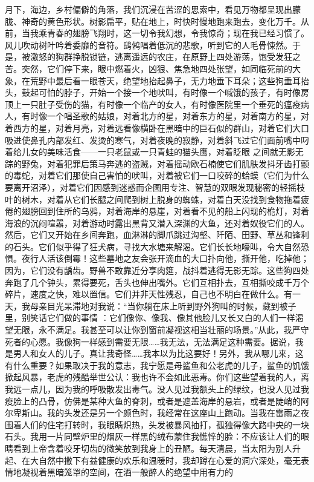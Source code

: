 \documentclass{article}
\begin{document}
月下，海边，乡村偏僻的角落，我们沉浸在苦涩的思索中，看见万物都呈现出朦胧、神奇的黄色形状。树影扁平，贴在地上，时快时慢地跑来跑去，变化万千。从前，当我乘青春的翅膀飞翔时，这一切令我幻想，令我惊奇；现在我已经习惯了。风儿吹动树叶吟着委靡的音符。鸱鸺唱着低沉的悲歌，听到它的人毛骨悚然。于是，被激怒的狗群挣脱锁链，逃离遥远的农庄，在原野上四处游荡，饱受发狂之苦。突然，它们停下来，眼中燃着火，凶狠、焦急地四处张望，如同临死前的大象，在荒野中最后看一眼苍天，绝望地抬起鼻子，无力地垂下耳朵；这些狗垂耳抬头，鼓起可怕的脖子，开始一个接一个地吠叫，有时像一个喊饿的孩子，有时像房顶上一只肚子受伤的猫，有时像一个临产的女人，有时像医院里一个垂死的瘟疫病人，有时像一个唱圣歌的姑娘，对着北方的星，对着东方的星，对着南方的星，对着西方的星，对着月亮，对着远看像横卧在黑暗中的巨石似的群山，对着它们大口吸进使鼻孔内部发红、发烫的寒气，对着夜晚的寂静，对着斜飞过它们面前嘴中叼着给儿女的美味活食——一只老鼠或一只青蛙的猫头鹰，对着眨眼
\newpage
之间就无影无踪的野兔，对着犯罪后策马奔逃的盗贼，对着摇动欧石楠使它们肌肤发抖牙齿打颤的毒蛇，对着它们那使自己害怕的吠叫，对着被它们一口咬碎的蛤蟆（它们为什么要离开沼泽），对着它们因感到迷惑而企图用专注、智慧的双眼发现秘密的轻摇枝叶的树木，对着从它们长腿之间爬到树上脱身的蜘蛛，对着白天没找到食物拖着疲倦的翅膀回到住所的乌鸦，对着海岸的悬崖，对着看不见的船上闪现的桅灯，对着海浪的沉闷喧嚣，对着游动时露出黑背又潜入深渊的大鱼，还对着奴役它们的人。然后，它们又开始在乡间奔跑，血淋淋的脚爪跳过沟壑、阡陌、田野、草丛和锋利的石头。它们似乎得了狂犬病，寻找大水塘来解渴。它们长长地嚎叫，令大自然恐惧。夜行人活该倒霉！这些墓地之友会张开滴血的大口扑向他，撕开他，吃掉他；因为，它们没有龋齿。野兽不敢靠近分享肉筵，战抖着逃得无影无踪。这些狗四处奔跑了几个钟头，累得要死，舌头也伸出嘴外。它们互相扑去，互相撕咬成千万个碎片，速度之快，难以置信。它们并非天性残忍，自己也不明白在做什么。有一天，我母亲目光呆滞地对我说：“当你躺在床上听到野外狗叫的时候，藏到被子里，别笑话它们做的事情
\newpage
：它们像你、像我、像其他脸儿又长又白的人们一样渴望无限，永不满足。我甚至可以让你到窗前凝视这相当壮丽的场景。”从此，我严守死者的心愿。我像狗一样感到需要无限……我无法，无法满足这种需要。据说，我是男人和女人的儿子。真让我奇怪……我本以为比这要好！另外，我从哪儿来，这有什么重要？如果取决于我的意志，我宁愿是母鲨鱼和公老虎的儿子，鲨鱼的饥饿掀起风暴，老虎的残酷举世公认：我也许不会如此恶毒。你们这些望着我的人，离我远一点儿，因为我的呼吸散发出毒气。没人见过我额头上的绿纹，也没人见过我瘦脸上的凸骨，仿佛是某种大鱼的脊刺，或者是遮盖海岸的悬岩，或者是陡峭的阿尔卑斯山。我的头发还是另一个颜色时，我经常在这座山上跑动。当我在雷雨之夜围着人们的住宅打转时，我眼睛炽热，头发被暴风抽打，孤独得像大路中央的一块石头。我用一片同壁炉里的烟灰一样黑的绒布蒙住我憔悴的脸：不应该让人们的眼睛看到上帝含着咬牙切齿的微笑放到我身上的丑陋。每天清晨，当太阳为别人升起、在大自然中撒下有益健康的欢乐和温暖时，我却蹲在心爱的洞穴深处，毫无表情地凝视着黑暗笼罩的空间，在酒一般醉人的绝望中用有力的
\end{document}
